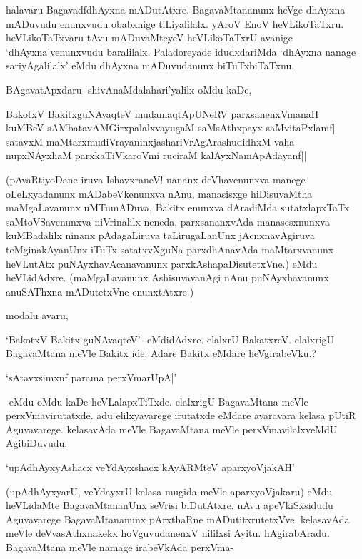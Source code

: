 halavaru BagavadfdhAyxna mADutAtxre. BagavaMtananunx heVge dhAyxna mADuvudu enunxvudu obabxnige tiLiyalilalx. yAroV EnoV heVLikoTaTxru. heVLikoTaTxvaru tAvu mADuvaMteyeV heVLikoTaTxrU avanige `dhAyxna'venunxvudu baralilalx. Paladoreyade idudxdariMda `dhAyxna nanage sariyAgalilalx' eMdu dhAyxna mADuvudanunx biTuTxbiTaTxnu.

BAgavatApxdaru `shivAnaMdalahari'yalilx oMdu kaDe,

\begin{shloka}
BakotxV BakitxguNAvaqteV mudamaqtApUNeRV parxsanenxVmanaH\\
kuMBeV sAMbatavAMGirxpalalxvayugaM saMsAthxpayx saMvitaPxlamf|\\
satavxM maMtarxmudiVrayaninxjashariVrAgArashudidhxM vaha-\\
nupxNAyxhaM parxkaTiVkaroVmi ruciraM kalAyxNamApAdayanf||
\end{shloka}

(pAvaRtiyoDane iruva IshavxraneV! nananx deVhavenunxva manege oLeLxyadanunx mADabeVkenunxva nAnu, manasisxge hiDisuvaMtha maMgaLavanunx uMTumADuva, Bakitx enunxva dAradiMda sutatxlapxTaTx saMtoVSavenunxva niVrinalilx neneda, parxsananxvAda manasesxnunxva kuMBadalilx ninanx pAdagaLiruva taLirugaLanUnx jAcnxnavAgiruva teMginakAyanUnx iTuTx satatxvXguNa parxdhAnavAda maMtarxvanunx heVLutAtx puNAyxhavAcanavanunx parxkAshapaDisutetxVne.) eMdu heVLidAdxre. (maMgaLavanunx AshisuvavanAgi nAnu puNAyxhavanunx anuSAThxna mADutetxVne enunxtAtxre.)

modalu avaru, 

`BakotxV Bakitx guNAvaqteV'- eMdidAdxre. elalxrU BakatxreV. elalxrigU BagavaMtana meVle Bakitx ide. Adare Bakitx eMdare heVgirabeVku.?

\begin{shloka}
`sAtavxsimxnf parama perxVmarUpA|'
\end{shloka}

-eMdu oMdu kaDe heVLalapxTiTxde. elalxrigU BagavaMtana meVle perxVmavirutatxde. adu elilxyavarege irutatxde eMdare avaravara kelasa pUtiR Aguvavarege. kelasavAda meVle BagavaMtana meVle perxVmavilalxveMdU AgibiDuvudu.

\begin{shloka}
`upAdhAyxyAshacx veYdAyxshacx kAyARMteV aparxyoVjakAH'
\end{shloka}

(upAdhAyxyarU, veYdayxrU kelasa mugida meVle aparxyoVjakaru)-eMdu heVLidaMte BagavaMtananUnx seVrisi biDutAtxre. nAvu apeVkiSxsidudu Aguvavarege BagavaMtananunx pArxthaRne mADutitxrutetxVve. kelasavAda meVle deVvasAthxnakekx hoVguvudanenxV nililxsi Ayitu. hAgirabAradu. BagavaMtana meVle namage irabeVkAda perxVma-

